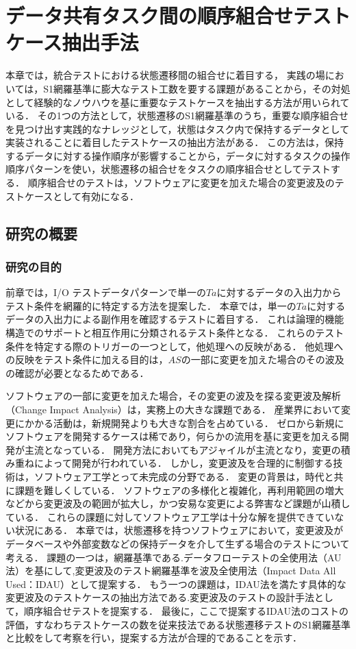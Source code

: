 \chapter{データ共有タスク間の順序組合せテストケース抽出手法} \label{chap:5}
本章では，統合テストにおける状態遷移間の組合せに着目する，
実践の場においては，S1網羅基準に膨大なテスト工数を要する課題があることから，その対処として経験的なノウハウを基に重要なテストケースを抽出する方法が用いられている\cite{yumoto2006}．
その1つの方法として，状態遷移のS1網羅基準のうち，重要な順序組合せを見つけ出す実践的なナレッジとして，状態はタスク内で保持するデータとして実装されることに着目したテストケースの抽出方法がある．
この方法は，保持するデータに対する操作順序が影響することから，データに対するタスクの操作順序パターンを使い，状態遷移の組合せをタスクの順序組合せとしてテストする．
順序組合せのテストは，ソフトウェアに変更を加えた場合の変更波及のテストケースとして有効になる．

\newpage
\section{研究の概要} \label{sec:5-1}
\subsection{研究の目的} \label{sec:5-1-1}
前章では，I/O テストデータパターンで単一の$Ta$に対するデータの入出力からテスト条件を網羅的に特定する方法を提案した．
本章では，単一の$Ta$に対するデータの入出力による副作用を確認するテストに着目する．
これは論理的機能構造でのサポートと相互作用に分類されるテスト条件となる．
これらのテスト条件を特定する際のトリガーの一つとして，他処理への反映がある．
他処理への反映をテスト条件に加える目的は，$AS$の一部に変更を加えた場合のその波及の確認が必要となるためである．

ソフトウェアの一部に変更を加えた場合，その変更の波及を探る変更波及解析（Change Impact Analysis）は，実務上の大きな課題である．
産業界において変更にかかる活動は，新規開発よりも大きな割合を占めている．
ゼロから新規にソフトウェアを開発するケースは稀であり，何らかの流用を基に変更を加える開発が主流となっている．
開発方法においてもアジャイルが主流となり，変更の積み重ねによって開発が行われている．
しかし，変更波及を合理的に制御する技術は，ソフトウェア工学とって未完成の分野である\cite{arnold1996software}．
変更の背景は，時代と共に課題を難しくしている．
ソフトウェアの多様化と複雑化，再利用範囲の増大などから変更波及の範囲が拡大し，かつ安易な変更による弊害など課題が山積している．
これらの課題に対してソフトウェア工学は十分な解を提供できていない状況にある\cite{li2013survey}．
本章では，状態遷移を持つソフトウェアにおいて，変更波及がデータベースや外部変数などの保持データを介して生ずる場合のテストについて考える．
課題の一つは，網羅基準である.データフローテストの全使用法（AU法）\cite{beiz90}を基にして,変更波及のテスト網羅基準を波及全使用法（Impact Data All Used：IDAU）として提案する．
もう一つの課題は，IDAU法を満たす具体的な変更波及のテストケースの抽出方法である.変更波及のテストの設計手法として，順序組合せテストを提案する．
最後に，ここで提案するIDAU法のコストの評価，すなわちテストケースの数を従来技法である状態遷移テストのS1網羅基準と比較をして考察を行い，提案する方法が合理的であることを示す．


